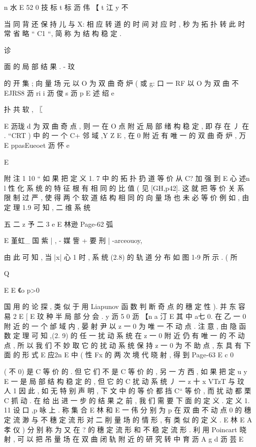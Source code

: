 {n
水
E
52 0 技 标 t 标 沥 伟
【 t 江 y 不

当 同 背 还 保 持 儿 与 X: 相 应 转 道 的 时 间 对 应 时 , 秒 为 拓 扑
转
此 时 常 省 略 “ C1 “, 简 称 为 结 构 稳 定 .

诊

面 的 局 部 结 果 . -
玟

的 开 集 ; 向 量 场 元 以 O 为 双 曲 奇 炉 ( 或 g: 口 一 RF 以 O 为 双 曲 不
EJRS8 沥 ri i 沥 俊 s 沥 p
E 述 绍 e

扑 共 软 , 〖

E 沥珑 d
为 双 曲 奇 点 , 则 一 在 O 点 附 近 局 部 绪 构 稳 定 , 即 存 在 丿 在 . “CRT )
中 的 一 个 C+ 邻 域 ,Y Z E , 在 0 附 近 有 唯 一 的 双 曲 奇 炉 , 万
E ppasEueoet 沥 怀 e

E

附 注 1 10 “ 如 果 把 定 义 1. 7 中 的 拓 扑 扔 道 等 价 从 C? 加 强 到
E 心 述n l
性 化 系 统 的 特 征 根 有 相 同 的 比 值 ( 见 [GH,p42]. 这 就 把 等 价 关 系
限 制 过 严 , 使 得 两 个 软 道 结 构 相 同 的 向 量 场 也 未 必 等 价 例 如 , 由
定 理 1.9 可 知 , 二 维 系 统

五 二 z 予 二 3
e
E 林逊
Page-62
弧

E 堇虹_ 国
紫 | , - 媒 訾 + 要 刑 | -arceouoy,

由 此 可 知 , 当 |x| 心 1 时 , 系 统 (2.8) 的 轨 道 分 布 如 图 1-9 所 示 . ( 所

Q

E E 《o p>0

国
用 的 论 探 , 类 似 于 用 Liapunov 函 数 判 断 奇 点 的 穗 定 性 ). 并 东 容 易
2
E
[
E
玟
种 半 局 部 分 会 .
y 沥 5
0 沥
【n a 汀 E
其 中 a七 0. 在 乙 一 0 附 近 的 一 个 邰 域 内 , 晏 射 尹 以 z 一 0 为 唯 一
不 动 点 . 注 意 , 由 隐 函 数 定 理 可 知 ,(2. 9) 的 任 一 扰 动 系 统 在 z 一 0
附 近 仍 有 唯 一 的 不 动 点 , 所 以 我 们 不 妙 取 它 的 扰 动 系 统 保 持 z 一 0
为 不 助 点 , 东 具 有 下 面 的 形 式
E 应2n
E 中 (
性 Fx 的 两 次 境 代 晓 射 , 得 到
Page-63
E c 0

( 不 0) 是 C 等 价 的 . 但 它 们 不 是 C 等 价 的 , 另 一 方 西 , 如 果 把 定
u y
E
一 是 局 部 结 构 稳 定 的 , 但 它 的 C 扰 动 系 统 丿 一 z 十 x VTzT 与
玟
人 1 因 此 , 如 无 特 别 声 明 , 下 文 中 的 等 价 都 挡 C“ 等 价 , 而 扰 动 都
栗 C 抓 动 .
在 给 出 进 一 步 的 结 果 之 前 , 我 们 需 要 下 面 的 定 义 .
定 义 1. 11 设 口 ,p 咏 上 . 称 集 合
E 林
和
E 一 伟
分 别 为 p 在 双 曲 不 动 点 0 的 穗 定 流 渺 与 不 穗 定 流 形
对 二 削 量 场 的 情 形 , 有 类 似 的 定 义 .
E
林
E
A 孝 仪 )
分 别 称 为 又 在 ? 的 穗 定 流 形 和 不 稳 定 流 形 .
利 用 Poincart 晓 射 , 可 以 把 吊 量 场 在 双 曲 闭 轨 附 近 的 研 究 转
中 育 沥
A g d 沥 芸 E

}
